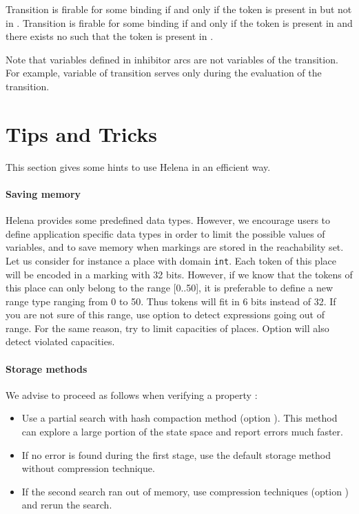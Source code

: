 Transition  is firable for some binding  if and only if
the token  is present in  but not in .
Transition  is firable for some binding  if and only if
the token  is present in  and there exists no 
such that the token  is present in .

Note that variables defined in inhibitor arcs are not variables of the
transition.  For example, variable  of transition  serves
only during the evaluation of the transition.

\section{Tips and Tricks}
This section gives some hints to use Helena in an efficient way.


\paragraph{Saving memory}
Helena provides some predefined data types. However, we encourage
users to define application specific data types in order to limit the
possible values of variables, and to save memory when markings are
stored in the reachability set. Let us consider for instance a place
with domain \texttt{int}. Each token of this place will be encoded in
a marking with 32 bits. However, if we know that the tokens of this
place can only belong to the range [0..50], it is preferable to define
a new range type ranging from 0 to 50. Thus tokens will fit in 6 bits
instead of 32. If you are not sure of this range, use option
 to detect expressions going out of
range. For the same reason, try to limit capacities of places. Option
 will also detect violated capacities.


\paragraph{Storage methods}
We advise to proceed as follows when verifying a property :
\begin{itemize}
\item Use a partial search with hash compaction method (option
  ).  This method can explore a large
  portion of the state space and report errors much faster.
\item If no error is found during the first stage, use the default
  storage method without compression technique.
\item If the second search ran out of memory, use compression
  techniques (option ) and rerun the search.
\end{itemize}


